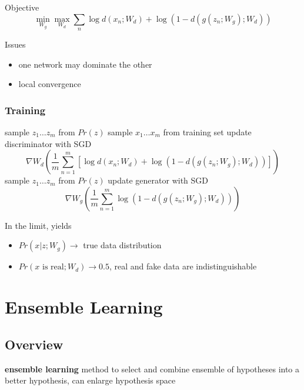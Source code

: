 \documentclass[]{article}
\theoremstyle{definition}
\begin{document}
Objective
\begin{equation*}
    \min_{W_g} \max_{W_d} \sum_n \log d(x_n; W_d) + \log(1- d(g(z_n;W_g); W_d))
\end{equation*}

Issues
\begin{itemize}
    \item one network may dominate the other
    \item local convergence
\end{itemize}

\subsubsection{Training}
\label{ssub:gan_training}

\begin{algorithmic}
    \State sample $z_1 \ldots z_m$ from $Pr(z)$
    \State sample $x_1 \ldots x_m$ from training set
    \State update discriminator with SGD
    \begin{equation*}
        \nabla W_d (\frac{1}{m} \sum_{n=1}^m [\log d(x_n; W_d) + \log(1- d(g(z_n;W_g); W_d))])
    \end{equation*}
    \EndFor
    \State sample $z_1 \ldots z_m$ from $Pr(z)$
    \State update generator with SGD
    \begin{equation*}
        \nabla W_g (\frac{1}{m} \sum_{n=1}^m \log(1- d(g(z_n;W_g); W_d)))
    \end{equation*}
\end{algorithmic}

In the limit, yields
\begin{itemize}
    \item $Pr(x|z;W_g) \to $ true data distribution
    \item $Pr(x \text{ is real}; W_d) \to 0.5$, real and fake data are indistinguishable
\end{itemize}

\section{Ensemble Learning}
\label{sec:ensemble_learning}

\subsection{Overview}
\label{sub:ensemble_overview}
\textbf{ensemble learning} method to select and combine ensemble of hypotheses into a better hypothesis, can enlarge hypothesis space
\end{document}
